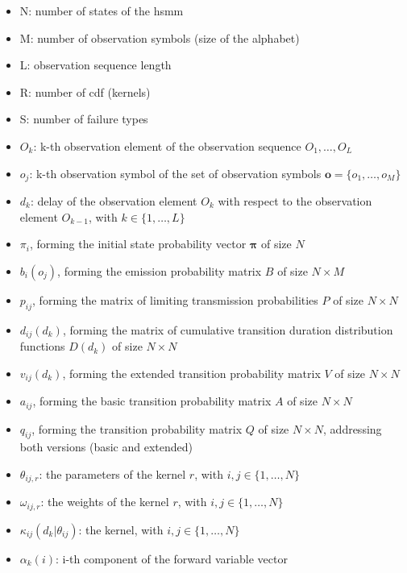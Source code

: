 \documentclass[mscthesis]{usiinfthesis}
\begin{document}
\begin{itemize}
    \item N: number of states of the \acrshort{hsmm}
    \item M: number of observation symbols (size of the alphabet)
    \item L: observation sequence length
    \item R: number of \acrshort{cdf} (kernels)
    \item S: number of failure types
    \item $O_k$: k-th observation element of the observation sequence
        $O_1, \dots, O_L$
    \item $o_j$: k-th observation symbol of the set of observation symbols
        $\boldsymbol{o} = \{o_1, \dots, o_M\}$
    \item $d_k$: delay of the observation element $O_k$ with respect to the
        observation element $O_{k-1}$, with $k \in \{1, \dots, L\}$
    \item $ \pi_i $, forming the initial state probability vector
        $ \boldsymbol{\pi} $ of size $ N $
    \item $ b_i(o_j) $, forming the emission probability matrix $ B $ of size
        $ N \times M $
    \item $ p_{ij} $, forming the matrix of limiting transmission probabilities
        $ P $ of size $ N \times N $
    \item $d_{ij}(d_k)$, forming the matrix of cumulative transition duration
        distribution functions $D(d_k)$ of size $N \times N$
    \item $v_{ij}(d_k) $, forming the extended transition probability matrix
        $V$ of size $N \times N$
    \item $a_{ij} $, forming the basic transition probability matrix $A$ of size
        $N \times N$
    \item $q_{ij}$, forming the transition probability matrix $Q$ of size
        $N \times N$, addressing both versions (basic and extended)
    \item $ \theta_{ij, r} $: the parameters of the kernel $ r $, with
        $i,j \in \{1, \dots, N\} $
    \item $ \omega_{ij, r} $: the weights of the kernel $ r $, with
        $i,j \in \{1, \dots, N\} $
    \item $\kappa_{ij}(d_k|\theta_{ij})$: the kernel, with
        $i,j \in \{1, \dots, N\} $
    \item $\alpha_k(i)$: i-th component of the forward variable vector

\end{itemize}
\end{document}
